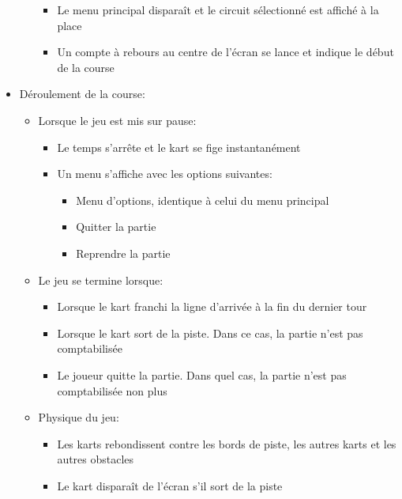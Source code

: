 \documentclass{article}
\begin{document}
\begin{itemize}
\begin{itemize}
\begin{itemize}
                        \item Le menu principal disparaît et le circuit sélectionné est affiché à la place
                        \item Un compte à rebours au centre de l'écran se lance et indique le début de la course
                    \end{itemize}
          \end{itemize}
    \item Déroulement de la course: \begin{itemize}
              \item Lorsque le jeu est mis sur pause: \begin{itemize}
                        \item Le temps s'arrête et le kart se fige instantanément
                        \item Un menu s'affiche avec les options suivantes: \begin{itemize}
                                  \item Menu d'options, identique à celui du menu principal
                                  \item Quitter la partie
                                  \item Reprendre la partie
                              \end{itemize}
                    \end{itemize}
              \item Le jeu se termine lorsque: \begin{itemize}
                        \item Lorsque le kart franchi la ligne d'arrivée à la fin du dernier tour
                        \item Lorsque le kart sort de la piste. Dans ce cas, la partie n'est pas comptabilisée
                        \item Le joueur quitte la partie. Dans quel cas, la partie n'est pas comptabilisée non plus
                    \end{itemize}
              \item Physique du jeu: \begin{itemize}
                        \item Les karts rebondissent contre les bords de piste, les autres karts et les autres obstacles
                        \item Le kart disparaît de l'écran s'il sort de la piste
                    \end{itemize}

\end{itemize}
\end{itemize}
\end{document}

